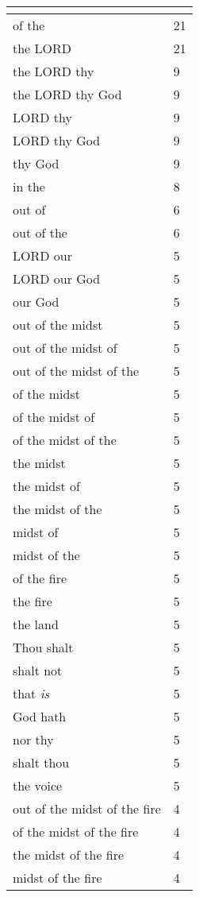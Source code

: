 \begin{center}
\begin{longtable}{|p{3.0in}|p{0.5in}|}
\hline \multicolumn{2}{c}{{ }} \\ \hline
\endfoot 
of the & 21\\ \hline 
the LORD & 21\\ \hline 
the LORD thy & 9\\ \hline 
the LORD thy God & 9\\ \hline 
LORD thy & 9\\ \hline 
LORD thy God & 9\\ \hline 
thy God & 9\\ \hline 
in the & 8\\ \hline 
out of & 6\\ \hline 
out of the & 6\\ \hline 
LORD our & 5\\ \hline 
LORD our God & 5\\ \hline 
our God & 5\\ \hline 
out of the midst & 5\\ \hline 
out of the midst of & 5\\ \hline 
out of the midst of the & 5\\ \hline 
of the midst & 5\\ \hline 
of the midst of & 5\\ \hline 
of the midst of the & 5\\ \hline 
the midst & 5\\ \hline 
the midst of & 5\\ \hline 
the midst of the & 5\\ \hline 
midst of & 5\\ \hline 
midst of the & 5\\ \hline 
of the fire & 5\\ \hline 
the fire & 5\\ \hline 
the land & 5\\ \hline 
Thou shalt & 5\\ \hline 
shalt not & 5\\ \hline 
that \emph{is} & 5\\ \hline 
God hath & 5\\ \hline 
nor thy & 5\\ \hline 
shalt thou & 5\\ \hline 
the voice & 5\\ \hline 
out of the midst of the fire & 4\\ \hline 
of the midst of the fire & 4\\ \hline 
the midst of the fire & 4\\ \hline 
midst of the fire & 4\\ \hline 

\end{longtable}
\end{center}
